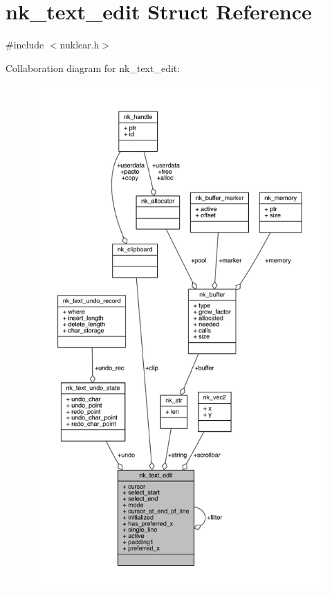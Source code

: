\hypertarget{structnk__text__edit}{}\section{nk\+\_\+text\+\_\+edit Struct Reference}
\label{structnk__text__edit}


{\ttfamily \#include $<$nuklear.\+h$>$}



Collaboration diagram for nk\+\_\+text\+\_\+edit\+:
\nopagebreak
\begin{figure}[H]
\begin{center}
\leavevmode
\includegraphics[height=550pt]{structnk__text__edit__coll__graph}
\end{center}
\end{figure}
